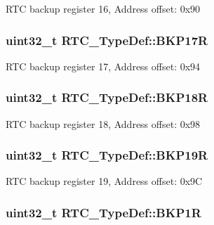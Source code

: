 R\-T\-C backup register 16, Address offset\-: 0x90 \hypertarget{struct_r_t_c___type_def_a90a305a8e00b357f28daef5041e5a8b1}{
\subsubsection[{B\-K\-P17\-R}]{ uint32\-\_\-t R\-T\-C\-\_\-\-Type\-Def\-::\-B\-K\-P17\-R}}\label{struct_r_t_c___type_def_a90a305a8e00b357f28daef5041e5a8b1}
R\-T\-C backup register 17, Address offset\-: 0x94 \hypertarget{struct_r_t_c___type_def_a171288f82cab2623832de779fb435d74}{
\subsubsection[{B\-K\-P18\-R}]{ uint32\-\_\-t R\-T\-C\-\_\-\-Type\-Def\-::\-B\-K\-P18\-R}}\label{struct_r_t_c___type_def_a171288f82cab2623832de779fb435d74}
R\-T\-C backup register 18, Address offset\-: 0x98 \hypertarget{struct_r_t_c___type_def_a993f54e8feff9254f795dfd3e000fc55}{
\subsubsection[{B\-K\-P19\-R}]{ uint32\-\_\-t R\-T\-C\-\_\-\-Type\-Def\-::\-B\-K\-P19\-R}}\label{struct_r_t_c___type_def_a993f54e8feff9254f795dfd3e000fc55}
R\-T\-C backup register 19, Address offset\-: 0x9\-C \hypertarget{struct_r_t_c___type_def_a5439bfca3708c6b8be6a74626f06111f}{
\subsubsection[{B\-K\-P1\-R}]{ uint32\-\_\-t R\-T\-C\-\_\-\-Type\-Def\-::\-B\-K\-P1\-R}}\label{struct_r_t_c___type_def_a5439bfca3708c6b8be6a74626f06111f}
